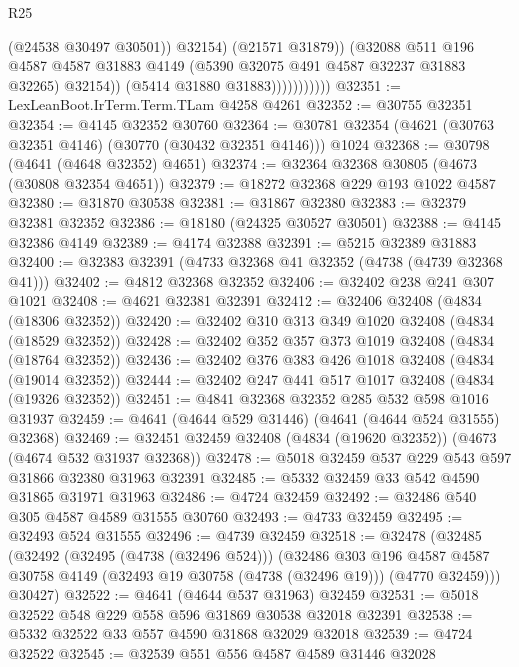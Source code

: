 \begin{lexlean}{R25}
\begin{coremodule}
                                (@24538 @30497 @30501))
                              @32154)
                            (@21571 @31879))
                          (@32088
                            @511
                            @196
                            @4587
                            @4587
                            @31883
                            @4149
                            (@5390 @32075 @491 @4587 @32237 @31883 @32265)
                            @32154))
                        (@5414 @31880 @31883)))))))))))
@32351 := LexLeanBoot.IrTerm.Term.TLam @4258 @4261
@32352 := @30755 @32351
@32354 := @4145 @32352 @30760
@32364 := @30781 @32354 (@4621 (@30763 @32351 @4146) (@30770 (@30432 @32351 @4146))) @1024
@32368 := @30798 (@4641 (@4648 @32352) @4651)
@32374 := @32364 @32368 @30805 (@4673 (@30808 @32354 @4651))
@32379 := @18272 @32368 @229 @193 @1022 @4587
@32380 := @31870 @30538
@32381 := @31867 @32380
@32383 := @32379 @32381 @32352
@32386 := @18180 (@24325 @30527 @30501)
@32388 := @4145 @32386 @4149
@32389 := @4174 @32388
@32391 := @5215 @32389 @31883
@32400 := @32383 @32391 (@4733 @32368 @41 @32352 (@4738 (@4739 @32368 @41)))
@32402 := @4812 @32368 @32352
@32406 := @32402 @238 @241 @307 @1021
@32408 := @4621 @32381 @32391
@32412 := @32406 @32408 (@4834 (@18306 @32352))
@32420 := @32402 @310 @313 @349 @1020 @32408 (@4834 (@18529 @32352))
@32428 := @32402 @352 @357 @373 @1019 @32408 (@4834 (@18764 @32352))
@32436 := @32402 @376 @383 @426 @1018 @32408 (@4834 (@19014 @32352))
@32444 := @32402 @247 @441 @517 @1017 @32408 (@4834 (@19326 @32352))
@32451 := @4841 @32368 @32352 @285 @532 @598 @1016 @31937
@32459 := @4641 (@4644 @529 @31446) (@4641 (@4644 @524 @31555) @32368)
@32469 := @32451 @32459 @32408 (@4834 (@19620 @32352)) (@4673 (@4674 @532 @31937 @32368))
@32478 := @5018 @32459 @537 @229 @543 @597 @31866 @32380 @31963 @32391
@32485 := @5332 @32459 @33 @542 @4590 @31865 @31971 @31963
@32486 := @4724 @32459
@32492 := @32486 @540 @305 @4587 @4589 @31555 @30760
@32493 := @4733 @32459
@32495 := @32493 @524 @31555
@32496 := @4739 @32459
@32518 := @32478
    (@32485
      (@32492
        (@32495 (@4738 (@32496 @524)))
        (@32486
          @303
          @196
          @4587
          @4587
          @30758
          @4149
          (@32493 @19 @30758 (@4738 (@32496 @19)))
          (@4770 @32459)))
      @30427)
@32522 := @4641 (@4644 @537 @31963) @32459
@32531 := @5018 @32522 @548 @229 @558 @596 @31869 @30538 @32018 @32391
@32538 := @5332 @32522 @33 @557 @4590 @31868 @32029 @32018
@32539 := @4724 @32522
@32545 := @32539 @551 @556 @4587 @4589 @31446 @32028

\end{coremodule}
\end{lexlean}
